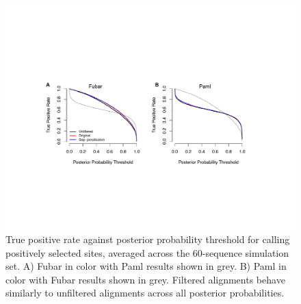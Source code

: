 \documentclass[10pt]{article}
\begin{document}
\begin{figure}[H]
\centerline{\includegraphics[width=7in]{Figures/fulltpr.pdf}}
\caption{\label{fulltpr} True positive rate against posterior probability threshold for calling positively selected sites, averaged across the 60-sequence simulation set. A) Fubar in color with Paml results shown in grey. B) Paml in color with Fubar results shown in grey. Filtered alignments behave similarly to unfiltered alignments across all posterior probabilities.}
\end{figure}
\end{document}
